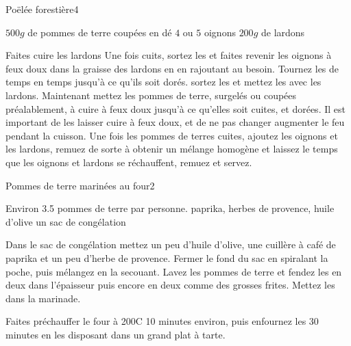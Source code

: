 \begin{recette}{Poëlée forestière}{4}{}{}
\begin{ingredients}
\ingredient $500\unit{g}$ de pommes de terre coupées en dé
\ingredient $4$ ou $5$ oignons
\ingredient $200\unit{g}$ de lardons
\end{ingredients}

\begin{preparation}
\etape Faites cuire les lardons
\etape Une fois cuits, sortez les et faites revenir les oignons à feux doux dans la graisse des lardons en en rajoutant au besoin. Tournez les de temps en temps jusqu'à ce qu'ils soit dorés.
\etape sortez les et mettez les avec les lardons. Maintenant mettez les pommes de terre, surgelés ou coupées préalablement, à cuire à feux doux jusqu'à ce qu'elles soit cuites, et dorées. Il est important de les laisser cuire à feux doux, et de ne pas changer augmenter le feu pendant la cuisson.
\etape Une fois les pommes de terres cuites, ajoutez les oignons et les lardons, remuez de sorte à obtenir un mélange homogène et laissez le temps que les oignons et lardons se réchauffent, remuez et servez.
\end{preparation}

\end{recette}

\begin{recette}{Pommes de terre marinées au four}{2}{}{}
\begin{ingredients}
\ingredient Environ 3.5 pommes de terre par personne.
\ingredient paprika, herbes de provence, huile d'olive
\ingredient un sac de congélation
\end{ingredients}

\begin{preparation}
\etape Dans le sac de congélation mettez un peu d'huile d'olive, une cuillère à café de paprika et un peu d'herbe de provence. Fermer le fond du sac en spiralant la poche, puis mélangez en la secouant.
\etape Lavez les pommes de terre et fendez les en deux dans l'épaisseur puis encore en deux comme des grosses frites.
\etape Mettez les dans la marinade.
\end{preparation}

\begin{cuisson}
Faites préchauffer le four à 200\degres C 10 minutes environ, puis enfournez les 30 minutes en les disposant dans un grand plat à tarte.
\end{cuisson}
\end{recette}

